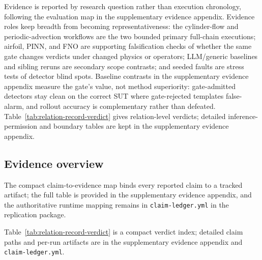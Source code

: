 \documentclass[preprint,12pt]{elsarticle}
\begin{document}
Evidence is reported by research question rather than execution chronology, following the evaluation map in the supplementary evidence appendix. Evidence roles keep breadth from becoming representativeness: the cylinder-flow and periodic-advection workflows are the two bounded primary full-chain executions; airfoil, PINN, and FNO are supporting falsification checks of whether the same gate changes verdicts under changed physics or operators; LLM/generic baselines and sibling reruns are secondary scope contrasts; and seeded faults are stress tests of detector blind spots. Baseline contrasts in the supplementary evidence appendix measure the gate's value, not method superiority: gate-admitted detectors stay clean on the correct SUT where gate-rejected templates false-alarm, and rollout accuracy is complementary rather than defeated. Table~\ref{tab:relation-record-verdict} gives relation-level verdicts; detailed inference-permission and boundary tables are kept in the supplementary evidence appendix.

\subsection{Evidence overview}
\label{subsec:claim-evidence-map}

The compact claim-to-evidence map binds every reported claim to a tracked artifact; the full table is provided in the supplementary evidence appendix, and the authoritative runtime mapping remains in \texttt{claim-ledger.yml} in the replication package.

\label{subsec:relation-record-verdict-map}

Table~\ref{tab:relation-record-verdict} is a compact verdict index; detailed claim paths and per-run artifacts are in the supplementary evidence appendix and \texttt{claim-ledger.yml}.
\end{document}
